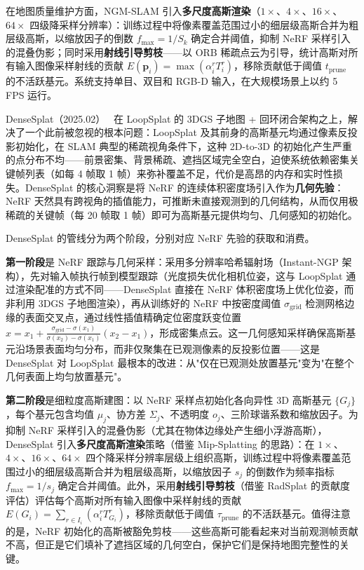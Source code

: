 在地图质量维护方面，NGM-SLAM 引入\textbf{多尺度高斯渲染}（$1\times$、$4\times$、$16\times$、$64\times$ 四级降采样分辨率）：训练过程中将像素覆盖范围过小的细层级高斯合并为粗层级高斯，以缩放因子的倒数 $f_{\max} = 1/S_k$ 确定合并阈值，抑制 NeRF 采样引入的混叠伪影；同时采用\textbf{射线引导剪枝}——以 ORB 稀疏点云为引导，统计高斯对所有输入图像采样射线的贡献 $E(\mathbf{p}_i) = \max(\alpha_i^r T_i^r)$，移除贡献低于阈值 $t_{\mathrm{prune}}$ 的不活跃基元。系统支持单目、双目和 RGB-D 输入，在大规模场景上以约 5 FPS 运行。

DenseSplat（2025.02）~\cite{2502_09111} 在 LoopSplat 的 3DGS 子地图 + 回环闭合架构之上，解决了一个此前被忽视的根本问题：LoopSplat 及其前身的高斯基元均通过像素反投影初始化，在 SLAM 典型的稀疏视角条件下，这种 2D-to-3D 的初始化产生严重的点分布不均——前景密集、背景稀疏、遮挡区域完全空白，迫使系统依赖密集关键帧列表（如每 4 帧取 1 帧）来弥补覆盖不足，代价是高昂的内存和实时性损失。DenseSplat 的核心洞察是将 NeRF 的连续体积密度场引入作为\textbf{几何先验}：NeRF 天然具有跨视角的插值能力，可推断未直接观测到的几何结构，从而仅用极稀疏的关键帧（每 20 帧取 1 帧）即可为高斯基元提供均匀、几何感知的初始化。

DenseSplat 的管线分为两个阶段，分别对应 NeRF 先验的获取和消费。

\textbf{第一阶段}是 NeRF 跟踪与几何采样：采用多分辨率哈希辐射场（Instant-NGP 架构），先对输入帧执行帧到模型跟踪（光度损失优化相机位姿，这与 LoopSplat 通过渲染配准的方式不同——DenseSplat 直接在 NeRF 体积密度场上优化位姿，而非利用 3DGS 子地图渲染），再从训练好的 NeRF 中按密度阈值 $\sigma_{\mathrm{grid}}$ 检测网格边缘的表面交叉点，通过线性插值精确定位密度跃变位置 $x = x_1 + \frac{\sigma_{\mathrm{grid}} - \sigma(x_1)}{\sigma(x_2) - \sigma(x_1)}(x_2 - x_1)$，形成密集点云。这一几何感知采样确保高斯基元沿场景表面均匀分布，而非仅聚集在已观测像素的反投影位置——这是 DenseSplat 对 LoopSplat 最根本的改进：从"仅在已观测处放置基元"变为"在整个几何表面上均匀放置基元"。

\textbf{第二阶段}是细粒度高斯建图：以 NeRF 采样点初始化各向异性 3D 高斯基元 $\{G_j\}$，每个基元包含均值 $\mu_j$、协方差 $\Sigma_j$、不透明度 $o_j$、三阶球谐系数和缩放因子。为抑制 NeRF 采样引入的混叠伪影（尤其在物体边缘处产生细小浮游高斯），DenseSplat 引入\textbf{多尺度高斯渲染}策略（借鉴 Mip-Splatting 的思路）：在 $1\times$、$4\times$、$16\times$、$64\times$ 四个降采样分辨率层级上组织高斯，训练过程中将像素覆盖范围过小的细层级高斯合并为粗层级高斯，以缩放因子 $s_j$ 的倒数作为频率指标 $f_{\max} = 1/s_j$ 确定合并阈值。此外，采用\textbf{射线引导剪枝}（借鉴 RadSplat 的贡献度评估）评估每个高斯对所有输入图像中采样射线的贡献 $E(G_i) = \sum_{r \in I_i}(\alpha_i^r T_{G_i}^r)$，移除贡献低于阈值 $\tau_{\mathrm{prune}}$ 的不活跃基元。值得注意的是，NeRF 初始化的高斯被豁免剪枝——这些高斯可能看起来对当前观测帧贡献不高，但正是它们填补了遮挡区域的几何空白，保护它们是保持地图完整性的关键。

